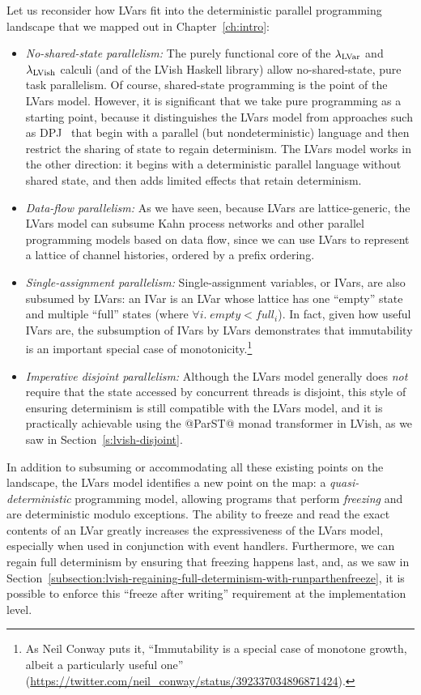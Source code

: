 Let us reconsider how LVars fit into the deterministic parallel
programming landscape that we mapped out in Chapter~\ref{ch:intro}:
\begin{itemize}
  \item \emph{No-shared-state parallelism:} The purely functional core
    of the $\lambda_{\textrm{LVar}}$ and $\lambda_{\textrm{LVish}}$ calculi (and of the LVish
    Haskell library) allow no-shared-state, pure task parallelism.  Of
    course, shared-state programming is the point of the LVars model.
    However, it is significant that we take pure programming as a
    starting point, because it distinguishes the LVars model from
    approaches such as DPJ~\cite{dpj-oopsla} that begin with a
    parallel (but nondeterministic) language and then restrict the
    sharing of state to regain determinism.  The LVars model works in
    the other direction: it begins with a deterministic parallel
    language without shared state, and then adds limited effects that
    retain determinism.
  \item \emph{Data-flow parallelism:} As we have seen, because LVars
    are lattice-generic, the LVars model can subsume Kahn process
    networks and other parallel programming models based on data flow,
    since we can use LVars to represent a lattice of channel
    histories, ordered by a prefix ordering.
  \item \emph{Single-assignment parallelism:} Single-assignment
    variables, or IVars, are also subsumed by LVars: an IVar is an
    LVar whose lattice has one ``empty'' state and multiple ``full''
    states (where $\forall{i}.\; \mathit{empty} < \mathit{full_i}$).
    In fact, given how useful IVars are, the subsumption of IVars by
    LVars demonstrates that immutability is an important special case
    of monotonicity.\footnote{As Neil Conway puts it, ``Immutability
      is a special case of monotone growth, albeit a particularly
      useful one''
      (\url{https://twitter.com/neil_conway/status/392337034896871424}).}
  \item \emph{Imperative disjoint parallelism:} Although the LVars
    model generally does \emph{not} require that the state accessed by
    concurrent threads is disjoint, this style of ensuring determinism
    is still compatible with the LVars model, and it is practically
    achievable using the @ParST@ monad transformer in LVish, as we saw
    in Section~\ref{s:lvish-disjoint}.
\end{itemize}
In addition to subsuming or accommodating all these existing points on
the landscape, the LVars model identifies a new point on the map: a
\emph{quasi-deterministic} programming model, allowing programs that
perform \emph{freezing} and are deterministic modulo exceptions.  The
ability to freeze and read the exact contents of an LVar greatly
increases the expressiveness of the LVars model, especially when used
in conjunction with event handlers.  Furthermore, we can regain full
determinism by ensuring that freezing happens last, and, as we saw in
Section~\ref{subsection:lvish-regaining-full-determinism-with-runparthenfreeze},
it is possible to enforce this ``freeze after writing'' requirement at
the implementation level.

